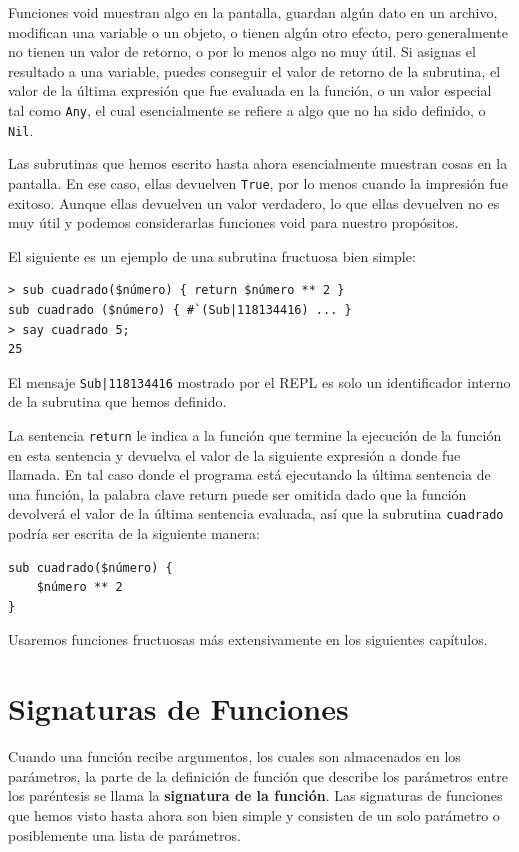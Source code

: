 Funciones void muestran algo en la pantalla, guardan algún dato
en un archivo, modifican una variable o un objeto, o tienen
algún otro efecto, pero generalmente no tienen un valor de
retorno, o por lo menos algo no muy útil. Si asignas el resultado
a una variable, puedes conseguir el valor de retorno de la subrutina,
el valor de la última expresión que fue evaluada en la función,
o un valor especial tal como {\tt Any}, el cual esencialmente se
refiere a algo que no ha sido definido, o {\tt Nil}.
%

Las subrutinas que hemos escrito hasta ahora esencialmente muestran cosas
en la pantalla. En ese caso, ellas devuelven {\tt True}, por lo
menos cuando la impresión fue exitoso. Aunque ellas devuelven un 
valor verdadero, lo que ellas devuelven no es muy útil y podemos
considerarlas funciones void para nuestro propósitos.

El siguiente es un ejemplo de una subrutina fructuosa bien simple:

\begin{lstlisting}
> sub cuadrado($número) { return $número ** 2 }
sub cuadrado ($número) { #`(Sub|118134416) ... }
> say cuadrado 5;
25
\end{lstlisting}

El mensaje \verb'Sub|118134416' mostrado por el REPL
es solo un identificador interno de la subrutina que hemos
definido.

La sentencia {\tt return} le indica a la función que termine
la ejecución de la función en esta sentencia y devuelva el valor 
de la siguiente expresión a donde fue llamada. En tal caso 
donde el programa está ejecutando la última sentencia de una 
función, la palabra clave return puede ser omitida dado que la
función devolverá el valor de la última sentencia evaluada,
así que la subrutina {\tt cuadrado} podría ser escrita de 
la siguiente manera:
\begin{lstlisting}
sub cuadrado($número) { 
    $número ** 2 
}
\end{lstlisting}

Usaremos funciones fructuosas más extensivamente en los 
siguientes capítulos.

\section{Signaturas de Funciones}

Cuando una función recibe argumentos, los cuales son
almacenados en los parámetros, la parte de la definición
de función que describe los parámetros entre los 
paréntesis se llama la {\bf signatura de la función}. Las 
signaturas de funciones que hemos visto hasta ahora son bien 
simple y consisten de un solo parámetro o posiblemente
una lista de parámetros.

